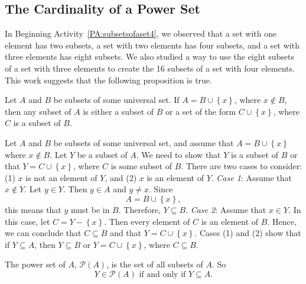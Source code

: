 \subsection*{The Cardinality of a Power Set}
In Beginning Activity~\ref{PA:subsetsofaset4}, we observed that a set with one element has two subsets, a set with two elements has four subsets, and a set with three elements has eight subsets.  We also studied a way to use the eight subsets of a set with three elements to create the 16 subsets of a set with four elements.  This work suggests that the following proposition is true.

\begin{proposition} \label{P:inductivestepforsubsets}
Let $A$ and $B$ be subsets of some universal set.  If  $A = B \cup \left\{ x \right\}$, where  $x \notin B$, then any subset of  $A$  is either a subset of  $B$  or a set of the form   
$C \cup \left\{ x \right\}$, where  $C$  is a subset of  $B$.
\end{proposition}
%
\begin{myproof}
Let $A$ and $B$ be subsets of some universal set, and assume that  $A = B \cup \left\{ x \right\}$ where  $x \notin B$.  Let  $Y$  be a subset of  $A$.  We need to show that  $Y$  is a subset of  $B$  or that   $Y = C \cup \left\{ x \right\}$, where  $C$   is some subset of  $B$.  There are two cases to consider:  (1)  $x$  is not an element of  $Y$\!, and (2)  $x$  is an element of  $Y$\!.
\vskip6pt
\noindent
\textit{Case 1}:   Assume that  $x \notin Y$\!.  Let  $y \in Y$.  Then  $y \in A$  and  
$y \ne x$.  Since  
\[
A = B \cup \left\{ x \right\}\!,
\]
this means that  $y$  must be in  $B$.  Therefore,  $Y \subseteq B$\!.
\vskip6pt
\noindent
\textit{Case 2}:  Assume that  $x \in Y$\!. In this case, let  $C = Y - \left\{ x \right\}$.  Then every element of  $C$  is an element of  $B$. Hence, we can conclude that  $C \subseteq B$  and that  $Y = C \cup \left\{ x \right\}$.
\vskip10pt
\noindent
Cases (1) and (2) show that if  $Y \subseteq A$, then  $Y \subseteq B$  or  
$Y = C \cup \left\{ x \right\}$,  where  \linebreak
$C \subseteq B$.
\end{myproof}
%
\noindent
The power set of  $A$, $\mathcal{P}( A )$, is the set of all subsets of  $A$.  So 
\[
Y \in \mathcal{P}\left( A \right)\text{ if and only if }Y \subseteq A.
\]

